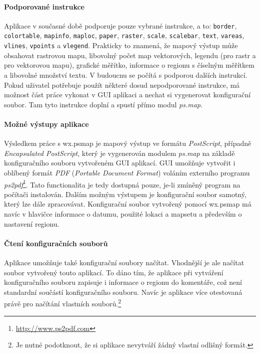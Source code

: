 \documentclass[a4paper,12pt,draft]{article}
\newcommand{\modul}[1]{\emph{#1}}
\newcommand{\instr}[1]{\lstinline[style=psmapInline]|#1|}
\begin{document}
{\paragraph*{Podporované instrukce}
Aplikace v současné době podporuje pouze vybrané instrukce, a to:
\instr{border}, \instr{colortable}, \instr{mapinfo}, \instr{maploc},
\instr{paper}, \instr{raster}, \instr{scale}, \instr{scalebar},
\instr{text}, \instr{vareas}, \instr{vlines}, \instr{vpoints} a
\instr{vlegend}. Prakticky to znamená, že mapový výstup může
obsahovat rastrovou mapu, libovolný počet map vektorových, legendu (pro
rastr a pro vektorovou mapu), grafické měřítko, informace o regionu
s číselným měřítkem a libovolné množství textu. V budoucnu se
počítá s podporou dalších instrukcí. Pokud uživatel potřebuje
použít některé dosud nepodporované instrukce, má možnost část
práce vykonat v GUI aplikaci a nechat si vygenerovat konfigurační
soubor. Tam tyto instrukce doplní a spustí přímo modul \modul{ps.map}.

\paragraph*{Možné výstupy aplikace}
Výsledkem práce s wx.psmap je mapový výstup ve formátu \emph{PostScript},
případně \emph{Encapsulated PostScript}, který je vygenerován modulem
\modul{ps.map} na základě konfiguračního souboru vytvořeném GUI
aplikací. GUI umožňuje vytvořit i oblíbený formát \emph{PDF} (\emph{Portable
Document Format}) voláním externího programu
\emph{ps2pdf}\footnote{\url{http://www.ps2pdf.com}}. Tato functionalita je tedy
dostupná pouze, je-li zmíněný program na počítači instalován. Dalším možným
výstupem je konfigurační soubor samotný,
který lze dále zpracovávat. Konfigurační soubor vytvořený pomocí
wx.psmap má navíc v hlavičce informace o datumu, použité lokaci a
mapsetu a především o nastavení regionu.

\paragraph*{Čtení konfiguračních souborů}
Aplikace umožňuje také konfigurační soubory načítat. Vhodnější
je ale načítat soubor vytvořený touto aplikací. To dáno tím, že
aplikace při vytváření konfiguračního souboru zapisuje i informace o
regionu do komentáře, což není standardní součástí konfiguračního
souboru. Navíc je aplikace více otestovaná právě pro načítání
vlastních souborů.\footnote{Je nutné podotknout, že si aplikace nevytváří
žádný vlastní odlišný formát.}

}
\end{document}
